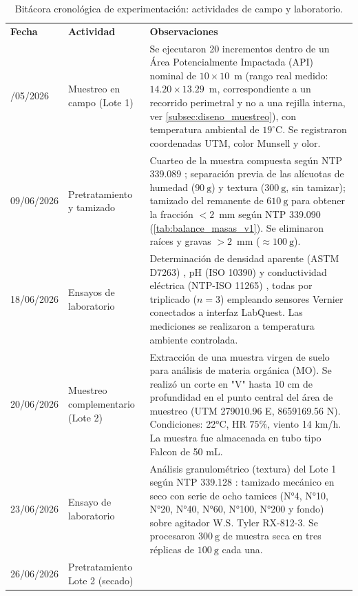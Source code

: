 \documentclass[fleqn]{jaes}
\begin{document}
\begin{table}[!htb]
\centering
\small
\caption{Bitácora cronológica de experimentación: actividades de campo y laboratorio.}\label{tab:bitacora_experimentacion}
\begin{tabular}{@{}p{1.9cm}p{3.9cm}p{10.6cm}@{}}
\toprule
\textbf{Fecha} & \textbf{Actividad} & \textbf{Observaciones} \\
\colrule
25/05/2026 &
Muestreo en campo (Lote 1) &
Se ejecutaron 20 incrementos dentro de un Área Potencialmente Impactada (API) nominal de $10 \times 10$~m (rango real medido: $14.20 \times 13.29$~m, correspondiente a un recorrido perimetral y no a una rejilla interna, ver \cref{subsec:diseno_muestreo}), con temperatura ambiental de $19^{\circ}\text{C}$. Se registraron coordenadas UTM, color Munsell y olor. \\
09/06/2026 &
Pretratamiento y tamizado &
Cuarteo de la muestra compuesta según NTP 339.089 \cite{INACAL2014}; separación previa de las alícuotas de humedad ($90~\text{g}$) y textura ($300~\text{g}$, sin tamizar); tamizado del remanente de $610~\text{g}$ para obtener la fracción $<2$~mm según NTP 339.090 \cite{INACAL2021} (\cref{tab:balance_masas_v1}). Se eliminaron raíces y gravas $>2$~mm ($\approx 100~\text{g}$). \\
18/06/2026 &
Ensayos de laboratorio &
Determinación de densidad aparente (ASTM D7263) \cite{ASTMInternational2009}, pH (ISO 10390) \cite{InternationalOrganizationforStandardization2021} y conductividad eléctrica (NTP-ISO 11265) \cite{INACAL2018}, todas por triplicado ($n=3$) empleando sensores Vernier conectados a interfaz LabQuest. Las mediciones se realizaron a temperatura ambiente controlada. \\
20/06/2026 &
Muestreo complementario (Lote 2) &
Extracción de una muestra virgen de suelo para análisis de materia orgánica (MO). Se realizó un corte en "V" hasta 10 cm de profundidad en el punto central del área de muestreo (UTM 279010.96 E, 8659169.56 N). Condiciones: 22°C, HR $75\%$, viento 14 km/h. La muestra fue almacenada en tubo tipo Falcon de 50 mL. \\
23/06/2026 &
Ensayo de laboratorio &
Análisis granulométrico (textura) del Lote 1 según NTP 339.128 \cite{INACAL1999}: tamizado mecánico en seco con serie de ocho tamices (N°4, N°10, N°20, N°40, N°60, N°100, N°200 y fondo) sobre agitador W.S. Tyler RX-812-3. Se procesaron $300~\text{g}$ de muestra seca en tres réplicas de $100~\text{g}$ cada una. \\
26/06/2026 &
Pretratamiento Lote 2 (secado) &

\end{tabular}
\end{table}
\end{document}
